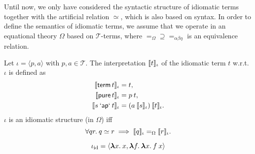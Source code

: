 Until now, we only have considered the syntactic structure of idiomatic terms
together with the artificial relation $\simeq$, which is also based on syntax.
In order to define the semantics of idiomatic terms, we assume that we operate
in an equational theory $\Omega$ based on $\mathcal{T}$-terms, where
$=_\Omega \supseteq =_{\alpha\beta\eta}$ is an equivalence relation.

\begin{definition}
Let $\iota = \langle p, a \rangle$ with $p,a \in \mathcal{T}$.
The interpretation $\llbracket t \rrbracket_\iota$ of the idiomatic term $t$ w.r.t. $\iota$
is defined as
\begin{align}
	\llbracket \operatorname{\mathsf{term}} t \rrbracket_\iota &= t, \\
	\llbracket \operatorname{\mathsf{pure}} t \rrbracket_\iota &= p \> t, \\
	\llbracket s \mathbin{\mathsf{`ap`}} t \rrbracket_\iota &= (a \> \llbracket s \rrbracket_\iota) \> \llbracket t \rrbracket_\iota.
\end{align}
$\iota$ is an idiomatic structure (in $\Omega$) iff
\begin{equation}
	\forall q r.\>q \simeq r \implies \llbracket q \rrbracket_\iota =_\Omega \llbracket r \rrbracket_\iota.
\end{equation}
\end{definition}

\begin{definition}
\begin{equation}
	\iota_\mathrm{id} = \langle {\boldsymbol\lambda} x.\>x, {\boldsymbol\lambda} f.\>{\boldsymbol\lambda} x.\>f \> x \rangle
\end{equation}
\end{definition}


